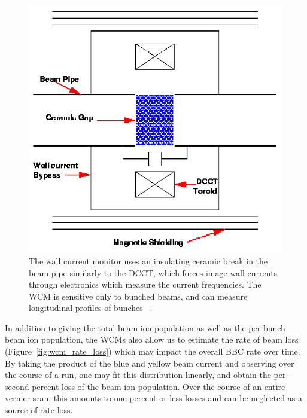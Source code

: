 \begin{figure}[ht]
  \begin{center}
    \includegraphics[width=0.75\linewidth]{./figures/dcct_schematic_cartoon}
    \caption{
      The wall current monitor uses an insulating ceramic break in the beam pipe
      similarly to the DCCT, which forces image wall currents through
      electronics which measure the current frequencies. The WCM is sensitive
      only to bunched beams, and can measure longitudinal profiles of bunches
      ~\cite{KawallFocus2004}.
    }
    \label{fig:dcct_schematic_cartoon}
  \end{center}
\end{figure}

In addition to giving the total beam ion population as well as the per-bunch
beam ion population, the WCMs also allow us to estimate the rate of beam loss
(Figure~\ref{fig:wcm_rate_loss}) which may impact the overall BBC rate over
time. By taking the product of the blue and yellow beam current and observing
over the course of a run, one may fit this distribution linearly, and obtain the
per-second percent loss of the beam ion population. Over the course of an entire
vernier scan, this amounts to one percent or less losses and can be neglected as
a source of rate-loss.

